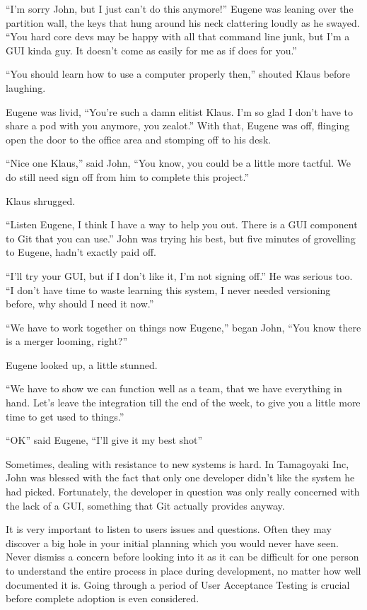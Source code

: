 \begin{trenches}
``I'm sorry John, but I just can't do this anymore!''  Eugene was leaning over the partition wall, the keys that hung around his neck clattering loudly as he swayed.  ``You hard core devs may be happy with all that command line junk, but I'm a GUI kinda guy.  It doesn't come as easily for me as if does for you.''

``You should learn how to use a computer properly then,'' shouted Klaus before laughing.

Eugene was livid, ``You're such a damn elitist Klaus.  I'm so glad I don't have to share a pod with you anymore, you zealot.''  With that, Eugene was off, flinging open the door to the office area and stomping off to his desk.

``Nice one Klaus,'' said John, ``You know, you could be a little more tactful.  We do still need sign off from him to complete this project.''

Klaus shrugged.

\thoughtbreak

``Listen Eugene, I think I have a way to help you out.  There is a GUI component to Git that you can use.''  John was trying his best, but five minutes of grovelling to Eugene, hadn't exactly paid off.

``I'll try your GUI, but if I don't like it, I'm not signing off.''  He was serious too.  ``I don't have time to waste learning this system, I never needed versioning before, why should I need it now.''

``We have to work together on things now Eugene,'' began John, ``You know there is a merger looming, right?''  

Eugene looked up, a little stunned.

``We have to show we can function well as a team, that we have everything in hand.  Let's leave the integration till the end of the week, to give you a little more time to get used to things.''

``OK'' said Eugene, ``I'll give it my best shot''
\end{trenches}

Sometimes, dealing with resistance to new systems is hard.  In Tamagoyaki Inc, John was blessed with the fact that only one developer didn't like the system he had picked.  Fortunately, the developer in question was only really concerned with the lack of a GUI, something that Git actually provides anyway.

It is very important to listen to users issues and questions.  Often they may discover a big hole in your initial planning which you would never have seen.  Never dismiss a concern before looking into it as it can be difficult for one person to understand the entire process in place during development, no matter how well documented it is.  Going through a period of User Acceptance Testing is crucial before complete adoption is even considered.

